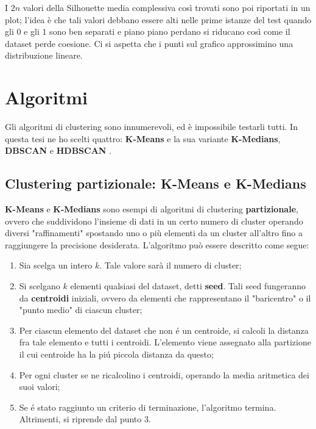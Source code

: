 \documentclass[12pt]{report}
\begin{document}
			I $2n$ valori della Silhouette media complessiva così trovati
			sono poi riportati in un plot; l'idea è che tali valori debbano
			essere alti nelle prime istanze del test quando gli $0$ e gli
			$1$ sono ben separati e piano piano perdano si riducano così
			come il dataset perde coesione. Ci si aspetta che i punti sul
			grafico approssimino una distribuzione lineare.

		\section{Algoritmi}

			Gli algoritmi di clustering sono innumerevoli, ed è
			impossibile testarli tutti. In questa tesi ne ho scelti
			quattro: \textbf{K-Means} \cite{1056489} e la sua variante
			\textbf{K-Medians}, \textbf{DBSCAN} \cite{10.5555/3001460.3001507}
			e \textbf{HDBSCAN} \cite{10.1007/978-3-642-37456-2_14}.

			\subsection{Clustering partizionale: K-Means e K-Medians}

				\textbf{K-Means} e \textbf{K-Medians} sono esempi di algoritmi
				di clustering \textbf{partizionale}, ovvero che suddividono
				l'insieme di dati in un certo numero di cluster operando diversi
				"raffinamenti" spostando uno o più elementi da un cluster all'altro
				fino a raggiungere la precisione desiderata. L'algoritmo può essere
				descritto come segue:

				\begin{enumerate}
					\item
						Sia scelga un intero $k$. Tale valore sarà il numero di cluster;
					\item
						Si scelgano $k$ elementi qualsiasi del dataset, detti \textbf{seed}.
						Tali seed fungeranno da \textbf{centroidi} iniziali, ovvero da elementi
						che rappresentano il "baricentro" o il "punto medio" di ciascun cluster;
					\item
						Per ciascun elemento del dataset che non é un centroide, si calcoli
						la distanza fra tale elemento e tutti i centroidi. L'elemento viene
						assegnato alla partizione il cui centroide ha la piú piccola distanza
						da questo;
					\item
						Per ogni cluster se ne ricalcolino i centroidi, operando la media
						aritmetica dei suoi valori;
					\item
						Se é stato raggiunto un criterio di terminazione, l'algoritmo termina.
						Altrimenti, si riprende dal punto 3.
				\end{enumerate}
\end{document}
